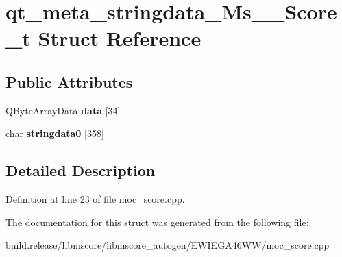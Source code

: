 \hypertarget{structqt__meta__stringdata___ms_____score__t}{}\section{qt\+\_\+meta\+\_\+stringdata\+\_\+\+Ms\+\_\+\+\_\+\+Score\+\_\+t Struct Reference}
\label{structqt__meta__stringdata___ms_____score__t}
\subsection*{Public Attributes}
\begin{DoxyCompactItemize}
\item 
\mbox{\label{structqt__meta__stringdata___ms_____score__t_aed71e84c8f5e839b50ca1ecf725fcc26}} 
Q\+Byte\+Array\+Data {\bfseries data} \mbox{[}34\mbox{]}
\item 
\mbox{\label{structqt__meta__stringdata___ms_____score__t_acc6341fbe2fc884d1b71fb6e43e8fa64}} 
char {\bfseries stringdata0} \mbox{[}358\mbox{]}
\end{DoxyCompactItemize}


\subsection{Detailed Description}


Definition at line 23 of file moc\+\_\+score.\+cpp.



The documentation for this struct was generated from the following file\+:\begin{DoxyCompactItemize}
\item 
build.\+release/libmscore/libmscore\+\_\+autogen/\+E\+W\+I\+E\+G\+A46\+W\+W/moc\+\_\+score.\+cpp\end{DoxyCompactItemize}
